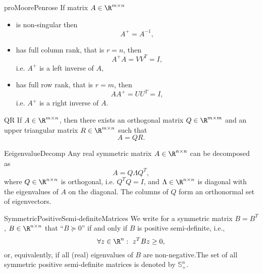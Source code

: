 \begin{pro}{proMoorePenrose}
    If matrix $A \in \R^{m \times n}$ 
    \begin{itemize}
        \item 
            is non-singular then 
            \begin{equation*}
                A^+ = A^{-1},
            \end{equation*}
        \item 
            has full column rank, that is $r = n$, then 
            \begin{equation*}
                A^+A = VV^T = I,
            \end{equation*}
            i\@.e\@. $A^+$ is a left inverse of $A$,
        \item 
            has full row rank, that is $r = m$, then 
            \begin{equation*}
                AA^+ = UU^T = I,
            \end{equation*}
            i\@.e\@. $A^+$ is a right inverse of $A$.
    \end{itemize}
\end{pro}

\begin{theo}{QR}
    If $A \in \R^{m \times n}$, then there exists an orthogonal matrix $Q \in \R^{m \times m}$ and an upper triangular matrix $R \in \R^{m \times n}$ such that
    \begin{equation*}
        A = QR.
    \end{equation*}
    \vspace{-0.5cm}
\end{theo}

\newpage

\begin{theo}{EeigenvalueDecomp}
    Any real symmetric matrix $A \in \R^{n \times n}$ can be decomposed as
    \begin{equation*}
        A = Q \Lambda Q^T,
    \end{equation*}
    where $Q \in \R^{n \times n}$ is orthogonal, i\@.e\@. $Q^T Q = I$, and $\Lambda \in \R^{n \times n}$ is diagonal with the eigenvalues of $A$ on the diagonal. The columns of $Q$ form an orthonormal set of eigenvectors.
\end{theo}

\begin{theo}{SymmetricPositiveSemi-definiteMatrices}
    We write for a symmetric matrix $B = B^T$, $B \in \R^{n \times n}$ that ``$B \succeq 0$'' if and only if $B$ is positive semi-definite, i\@.e\@., 
    \begin{equation*}
        \forall z \in \R^n: \ z^T B z \geq 0,
    \end{equation*}
    or, equivalently, if all (real) eigenvalues of $B$ are non-negative.The set of all symmetric positive semi-definite matrices is denoted by $\mathbb{S}^n_+$. 
\end{theo}

